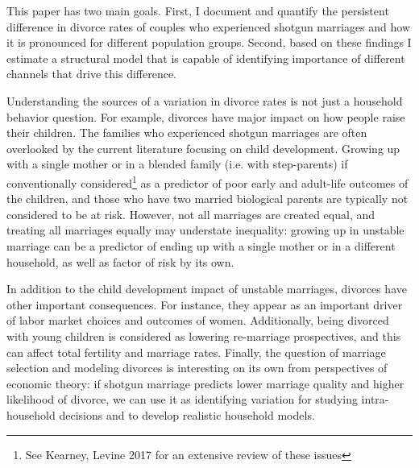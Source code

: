 \documentclass[12pt,letter]{article}
\begin{document}
This paper has two main goals. First, I document and quantify the persistent difference in divorce rates of couples who experienced shotgun marriages and how it is pronounced for different population groups. Second, based on these findings I estimate a structural model that is capable of identifying importance of different channels that drive this difference.

Understanding the sources of a variation in divorce rates is not just a household behavior question. For example, divorces have major impact on how people raise their children. The families who experienced shotgun marriages are often overlooked by the current literature focusing on child development. Growing up with a single mother or in a blended family (i.e. with step-parents) if conventionally considered\footnote{See Kearney, Levine 2017\nocite{kearney} for an extensive review of these issues} as a predictor of poor early and adult-life outcomes of the children, and those who have two married biological parents are typically not considered to be at risk. However, not all marriages are created equal, and treating all marriages equally may understate inequality: growing up in unstable marriage can be a predictor of ending up with a single mother or in a different household, as well as factor of risk by its own.

In addition to the child development impact of unstable marriages, divorces have other important consequences. For instance, they appear as an important driver of labor market choices and outcomes of women. Additionally, being divorced with young children is considered as lowering re-marriage prospectives, and this can affect total fertility and marriage rates. Finally, the question of marriage selection and modeling divorces is interesting on its own from perspectives of economic theory: if shotgun marriage predicts lower marriage quality and higher likelihood of divorce, we can use it as identifying variation for studying intra-household decisions and to develop realistic household models.
\end{document}
